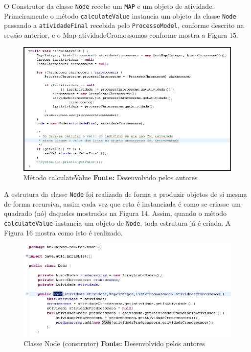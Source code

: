 \par O Construtor da classe \texttt{Node} recebe um \texttt{MAP} e um objeto de atividade. Primeiramente o método \texttt{calculateValue} instancia um objeto da classe \texttt{Node} passando a \texttt{atividadeFinal} recebida pelo \texttt{ProcessoModel}, conforme descrito na sessão anterior, e o Map atividadeCromossomos conforme mostra a Figura 15.

\newpage

\begin{figure}[h!]
	\centerline{\includegraphics[scale=0.7]{./imagens/codigo_calculate_value.png}}
	\caption[Distribuição de trabalho]
	{Método calculateValue \textbf{Fonte:} Desenvolvido pelos autores}
	\label{fig:exemplo1}
\end{figure}

\par A estrutura da classe \texttt{Node} foi realizada de forma a produzir objetos de si mesma de forma recursiva, assim cada
vez que esta é instanciada é como se criasse um quadrado (nó) daqueles mostrados na Figura 14. Assim, quando 
o método \texttt{calculateValue} instancia um objeto de \texttt{Node}, toda estrutura já é criada. A Figura 16 mostra como isto
é realizado. 

\begin{figure}[h!]
	\centerline{\includegraphics[scale=0.8]{./imagens/node_class.png}}
	\caption[Distribuição de trabalho]
	{Classe Node (construtor) \textbf{Fonte:} Desenvolvido pelos autores}
	\label{fig:exemplo1}
\end{figure}


